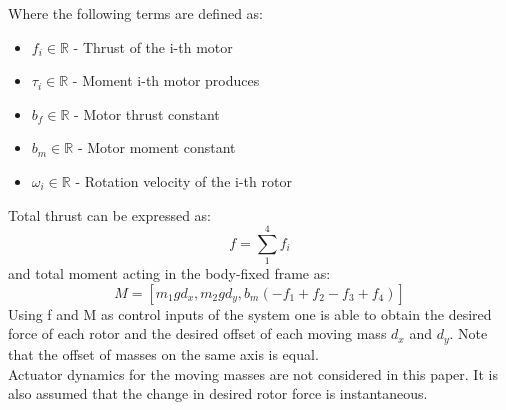 \noindent Where the following terms are defined as:

\begin{itemize}
	\item $f_i \in \mathbb{R}$ - Thrust of the i-th motor
	
	\item $\tau_i \in \mathbb{R}$ - Moment i-th motor produces
	
	\item $b_f \in \mathbb{R}$ - Motor thrust constant
	
	\item $b_m \in \mathbb{R}$ - Motor moment constant
	
	\item $\omega_i \in \mathbb{R}$ - Rotation velocity of the i-th rotor
\end{itemize}

Total thrust can be expressed as:
\begin{equation}
	f = \sum_{1}^{4}f_i
\end{equation}
and total moment acting in the body-fixed frame as:
\begin{equation}
	M = [m_{1}gd_x ,m_{2}gd_y,b_m(-f_1 + f_2 - f_3 + f_4)]
\end{equation}
Using f and M as control inputs of the system one is able to obtain the desired force of each rotor and the desired offset of each moving mass $d_x$ and $d_y$. Note that the offset of masses on the same axis is equal. \\
Actuator dynamics for the moving masses are not considered in this paper. It is also assumed that the change in desired rotor force is instantaneous. 